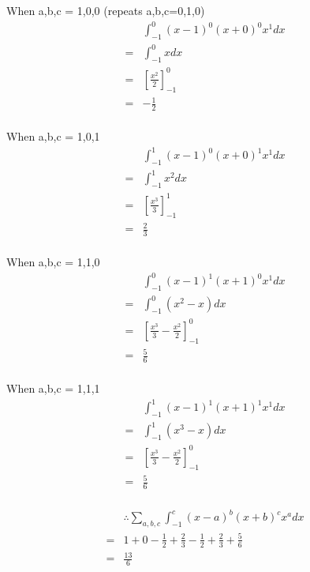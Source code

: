 \documentclass{article}
\begin{document}
When a,b,c = 1,0,0 (repeats a,b,c=0,1,0)
\begin{align*}
    &\int^0_{-1}(x-1)^0(x+0)^0x^1dx\\
    =&\int^0_{-1}xdx\\
    =&\left[\frac{x^2}{2}\right]^0_{-1}\\
    =& - \frac{1}{2}\\
\end{align*}

When a,b,c = 1,0,1
\begin{align*}
    &\int^1_{-1}(x-1)^0(x+0)^1x^1dx\\
    =&\int^1_{-1}x^2dx\\
    =&\left[\frac{x^3}{3}\right]^1_{-1}\\
    =&\frac{2}{3}\\
\end{align*}

When a,b,c = 1,1,0
\begin{align*}
    &\int^0_{-1}(x-1)^1(x+1)^0x^1dx\\
    =&\int^0_{-1}(x^2 - x)dx\\
    =&\left[\frac{x^3}{3} - \frac{x^2}{2}\right]^0_{-1}\\
    =&\frac{5}{6}\\
\end{align*}

When a,b,c = 1,1,1
\begin{align*}
    &\int^1_{-1}(x-1)^1(x+1)^1x^1dx\\
    =&\int^1_{-1}(x^3 - x)dx\\
    =&\left[\frac{x^3}{3} - \frac{x^2}{2}\right]^0_{-1}\\
    =&\frac{5}{6}\\
\end{align*}

\begin{align*}
    &\therefore \sum_{a,b,c}\int^c_{-1}(x-a)^b(x+b)^cx^adx\\
    =& 1 + 0 - \frac{1}{2} + \frac{2}{3} - \frac{1}{2}
         + \frac{2}{3} + \frac{5}{6}\\
    =& \frac{13}{6}
\end{align*}
\end{document}
